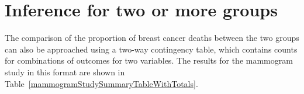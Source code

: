\section{Inference for two or more groups}
\label{twoWayTablesAndChiSquare}
The comparison of the proportion of breast cancer deaths between the two groups can also be approached using a two-way contingency table, which contains counts for combinations of outcomes for two variables. The results for the mammogram study in this format are shown in Table~\ref{mammogramStudySummaryTableWithTotals}.

